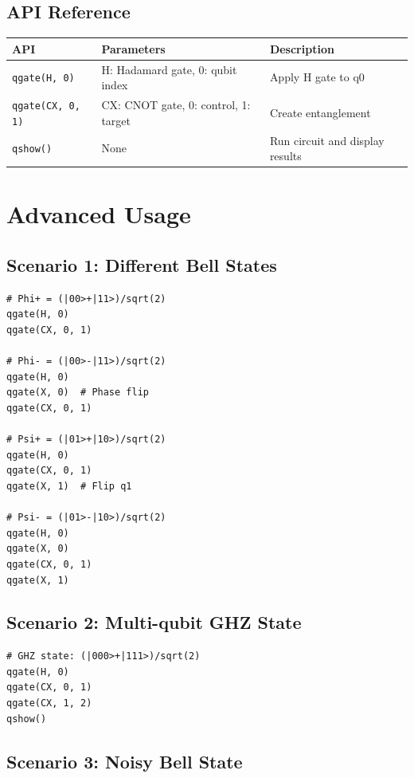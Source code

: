 \documentclass[12pt,a4paper]{article}
\begin{document}
\subsection{API Reference}

\begin{center}
\begin{tabular}{|l|l|l|}
\hline
\textbf{API} & \textbf{Parameters} & \textbf{Description} \\
\hline
\texttt{qgate(H, 0)} & H: Hadamard gate, 0: qubit index & Apply H gate to q0 \\
\hline
\texttt{qgate(CX, 0, 1)} & CX: CNOT gate, 0: control, 1: target & Create entanglement \\
\hline
\texttt{qshow()} & None & Run circuit and display results \\
\hline
\end{tabular}
\end{center}

\section{Advanced Usage}

\subsection{Scenario 1: Different Bell States}

\begin{verbatim}
# Phi+ = (|00>+|11>)/sqrt(2)
qgate(H, 0)
qgate(CX, 0, 1)

# Phi- = (|00>-|11>)/sqrt(2)
qgate(H, 0)
qgate(X, 0)  # Phase flip
qgate(CX, 0, 1)

# Psi+ = (|01>+|10>)/sqrt(2)
qgate(H, 0)
qgate(CX, 0, 1)
qgate(X, 1)  # Flip q1

# Psi- = (|01>-|10>)/sqrt(2)
qgate(H, 0)
qgate(X, 0)
qgate(CX, 0, 1)
qgate(X, 1)
\end{verbatim}

\subsection{Scenario 2: Multi-qubit GHZ State}

\begin{verbatim}
# GHZ state: (|000>+|111>)/sqrt(2)
qgate(H, 0)
qgate(CX, 0, 1)
qgate(CX, 1, 2)
qshow()
\end{verbatim}

\subsection{Scenario 3: Noisy Bell State}
\end{document}
